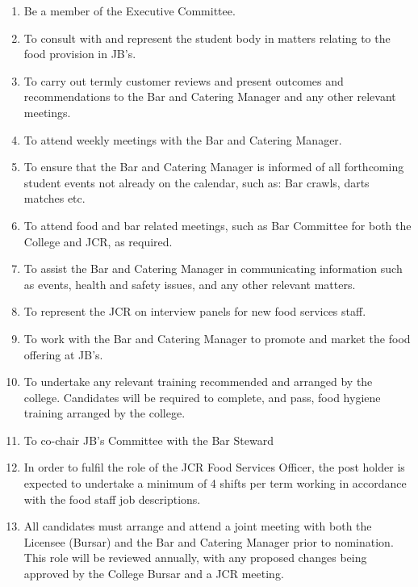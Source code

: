 \begin{enumerate}
    \item Be a member of the Executive Committee.
    \item To consult with and represent the student body in matters relating to the food provision in JB’s. 
    \item To carry out termly customer reviews and present outcomes and recommendations to the Bar and Catering Manager and any other relevant meetings.
    \item To attend weekly meetings with the Bar and Catering Manager.
    \item To ensure that the Bar and Catering Manager is informed of all forthcoming student events not already on the calendar, such as: Bar crawls, darts matches etc.
    \item To attend food and bar related meetings, such as Bar Committee for both the College and JCR, as required.
    \item To assist the Bar and Catering Manager in communicating information such as events, health and safety issues, and any other relevant matters. 
    \item To represent the JCR on interview panels for new food services staff.
    \item To work with the Bar and Catering Manager to promote and market the food offering at JB’s.
    \item To undertake any relevant training recommended and arranged by the college. Candidates will be required to complete, and pass, food hygiene training arranged by the college.
    \item To co-chair JB’s Committee with the Bar Steward 
    \item In order to fulfil the role of the JCR Food Services Officer, the post holder is expected to undertake a minimum of 4 shifts per term working in accordance with the food staff job descriptions. 
    \item All candidates must arrange and attend a joint meeting with both the Licensee (Bursar) and the Bar and Catering Manager prior to nomination. This role will be reviewed annually, with any proposed changes being approved by the College Bursar and a JCR meeting.
\end{enumerate}

